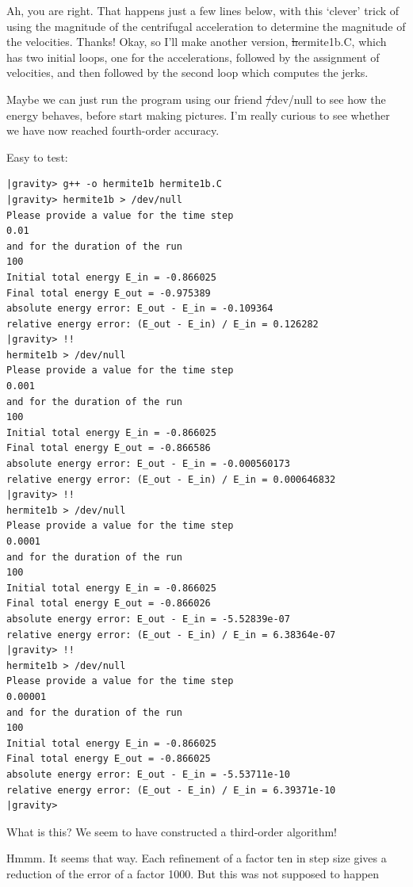 \bob
Ah, you are right.  That happens just a few lines below, with this
`clever' trick of using the magnitude of the centrifugal acceleration
to determine the magnitude of the velocities.  Thanks!  Okay, so I'll
make another version, {\st hermite1b.C}, which has two initial loops,
one for the accelerations, followed by the assignment of velocities,
and then followed by the second loop which computes the jerks.

\carol
Maybe we can just run the program using our friend {\st /dev/null} to
see how the energy behaves, before start making pictures.  I'm really
curious to see whether we have now reached fourth-order accuracy.

\bob
Easy to test:

\cba

\begin{small}
\begin{verbatim}
|gravity> g++ -o hermite1b hermite1b.C
|gravity> hermite1b > /dev/null
Please provide a value for the time step
0.01
and for the duration of the run
100
Initial total energy E_in = -0.866025
Final total energy E_out = -0.975389
absolute energy error: E_out - E_in = -0.109364
relative energy error: (E_out - E_in) / E_in = 0.126282
|gravity> !!
hermite1b > /dev/null
Please provide a value for the time step
0.001
and for the duration of the run
100
Initial total energy E_in = -0.866025
Final total energy E_out = -0.866586
absolute energy error: E_out - E_in = -0.000560173
relative energy error: (E_out - E_in) / E_in = 0.000646832
|gravity> !!
hermite1b > /dev/null
Please provide a value for the time step
0.0001
and for the duration of the run
100
Initial total energy E_in = -0.866025
Final total energy E_out = -0.866026
absolute energy error: E_out - E_in = -5.52839e-07
relative energy error: (E_out - E_in) / E_in = 6.38364e-07
|gravity> !!
hermite1b > /dev/null
Please provide a value for the time step
0.00001
and for the duration of the run
100
Initial total energy E_in = -0.866025
Final total energy E_out = -0.866025
absolute energy error: E_out - E_in = -5.53711e-10
relative energy error: (E_out - E_in) / E_in = 6.39371e-10
|gravity> 
\end{verbatim}
\end{small}

\abc

\carol
What is this?  We seem to have constructed a third-order algorithm!

\alice
Hmmm.  It seems that way.  Each refinement of a factor ten in step
size gives a reduction of the error of a factor 1000.  But this was
not supposed to happen

